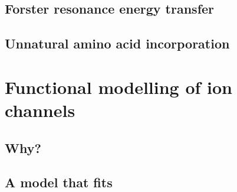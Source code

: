 \subsection{Forster resonance energy transfer}

\subsection{Unnatural amino acid incorporation}

\section{Functional modelling of ion channels}

\subsection{Why?}

\subsection{A model that fits}
